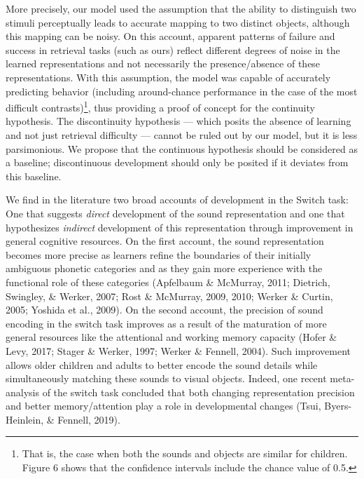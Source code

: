 \documentclass[english,,man]{apa6}
\let\rmarkdownfootnote\footnote%
\def\footnote{\protect\rmarkdownfootnote}
\begin{document}
More precisely, our model used the assumption that the ability to distinguish two stimuli perceptually leads to accurate mapping to two distinct objects, although this mapping can be noisy. On this account, apparent patterns of failure and success in retrieval tasks (such as ours) reflect different degrees of noise in the learned representations and not necessarily the presence/absence of these representations. With this assumption, the model was capable of accurately predicting behavior (including around-chance performance in the case of the most difficult contrasts)\footnote{That is, the case when both the sounds and objects are similar for children. Figure 6 shows that the confidence intervals include the chance value of 0.5.}, thus providing a proof of concept for the continuity hypothesis. The discontinuity hypothesis --- which posits the absence of learning and not just retrieval difficulty --- cannot be ruled out by our model, but it is less parsimonious. We propose that the continuous hypothesis should be considered as a baseline; discontinuous development should only be posited if it deviates from this baseline.

We find in the literature two broad accounts of development in the Switch task: One that suggests \emph{direct} development of the sound representation and one that hypothesizes \emph{indirect} development of this representation through improvement in general cognitive resources. On the first account, the sound representation becomes more precise as learners refine the boundaries of their initially ambiguous phonetic categories and as they gain more experience with the functional role of these categories (Apfelbaum \& McMurray, 2011; Dietrich, Swingley, \& Werker, 2007; Rost \& McMurray, 2009, 2010; Werker \& Curtin, 2005; Yoshida et al., 2009). On the second account, the precision of sound encoding in the switch task improves as a result of the maturation of more general resources like the attentional and working memory capacity (Hofer \& Levy, 2017; Stager \& Werker, 1997; Werker \& Fennell, 2004). Such improvement allows older children and adults to better encode the sound details while simultaneously matching these sounds to visual objects. Indeed, one recent meta-analysis of the switch task concluded that both changing representation precision and better memory/attention play a role in developmental changes (Tsui, Byers-Heinlein, \& Fennell, 2019).
\end{document}
